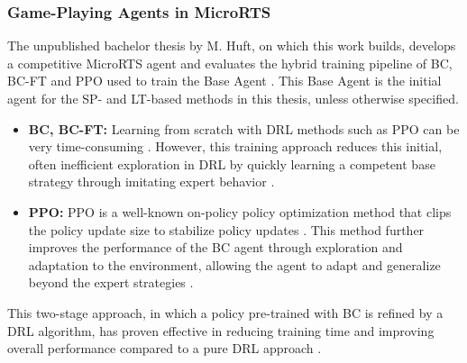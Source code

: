 \documentclass[10pt,twocolumn,letterpaper]{article}
\begin{document}
\subsubsection{Game-Playing Agents in MicroRTS}
The unpublished bachelor thesis by M. Huft, on which this work builds, develops a competitive MicroRTS agent and evaluates the hybrid training pipeline of BC, BC-FT and PPO used to train the Base Agent \cite{huft2023microrts}.
This Base Agent is the initial agent for the SP- and LT-based methods in this thesis, unless otherwise specified.
\begin{itemize}
    \item \textbf{BC, BC-FT:} Learning from scratch with DRL methods such as PPO can be very time-consuming \cite{martin2021beclone}.
    However, this training approach reduces this initial, often inefficient exploration in DRL by quickly learning a competent base strategy through imitating expert behavior \cite{torabi2018behavioral}.
    \item \textbf{PPO:} PPO is a well-known on-policy policy optimization method that clips the policy update size to stabilize policy updates \cite{schulman2017ppo}.
    This method further improves the performance of the BC agent through exploration and adaptation to the environment, allowing the agent to adapt and generalize beyond the expert strategies \cite{martin2021beclone}.
\end{itemize}
This two-stage approach, in which a policy pre-trained with BC is refined by a DRL algorithm, has proven effective in reducing training time and improving overall performance compared to a pure DRL approach \cite{martin2021beclone}.
\end{document}
